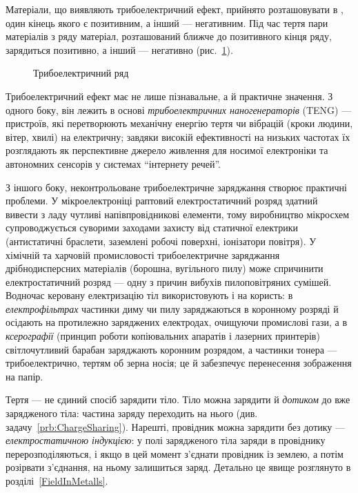 Матеріали, що виявляють трибоелектричний ефект, прийнято розташовувати в
, один кінець якого є позитивним, а інший --- негативним. Під
час тертя пари матеріалів з ряду матеріал, розташований ближче до позитивного кінця ряду,
зарядиться позитивно, а інший --- негативно (рис.~\ref{tikz:triboseries}).


\begin{figure}[h!]
	\centering
	\caption{Трибоелектричний ряд\label{tikz:triboseries}}
\end{figure}


Трибоелектричний ефект має не лише пізнавальне, а й практичне значення. З одного боку, він
лежить в основі \emph{трибоелектричних наногенераторів} (TENG) --- пристроїв, які
перетворюють механічну енергію тертя чи вібрацій (кроки людини, вітер, хвилі) на
електричну; завдяки високій ефективності на низьких частотах їх розглядають як
перспективне джерело живлення для носимої електроніки та автономних сенсорів у системах
\enquote{інтернету речей}.

З іншого боку, неконтрольоване трибоелектричне заряджання створює практичні проблеми. У
мікроелектроніці раптовий електростатичний розряд здатний вивести з ладу
чутливі напівпровідникові елементи, тому виробництво мікросхем супроводжується суворими
заходами захисту від статичної електрики (антистатичні браслети, заземлені робочі
поверхні, іонізатори повітря). У хімічній та харчовій промисловості трибоелектричне
заряджання дрібнодисперсних матеріалів (борошна, вугільного пилу) може спричинити
електростатичний розряд --- одну з причин вибухів пилоповітряних сумішей. Водночас
керовану електризацію тіл використовують і на користь: в \emph{електрофільтрах} частинки
диму чи пилу заряджаються в коронному розряді й осідають на протилежно заряджених
електродах, очищуючи промислові гази, а в \emph{ксерографії} (принцип роботи
копіювальних апаратів і лазерних принтерів) світлочутливий барабан заряджають коронним
розрядом, а частинки тонера --- трибоелектрично, тертям об зерна носія; це й забезпечує
перенесення зображення на папір.

Тертя --- не єдиний спосіб зарядити тіло. Тіло можна зарядити й \emph{дотиком} до вже
зарядженого тіла: частина заряду переходить на нього (див. задачу~\ref{prb:ChargeSharing}).
Нарешті, провідник можна зарядити без дотику --- \emph{електростатичною індукцією}:
у полі зарядженого тіла заряди в провіднику перерозподіляються, і якщо в цей момент
з'єднати провідник із землею, а потім розірвати з'єднання, на ньому залишиться заряд.
Детально це явище розглянуто в розділі~\ref{FieldInMetalls}.


